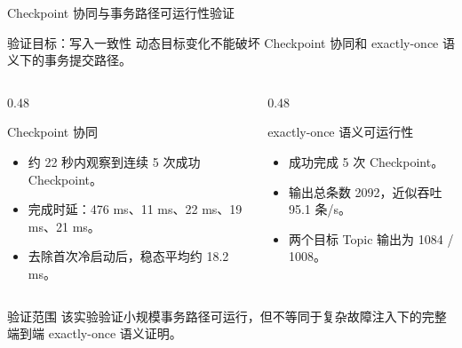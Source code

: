 \documentclass[fontset=macnew,xcolor=table,dvipsnames,svgnames,aspectratio=169]{ctexbeamer}
\begin{document}
\begin{frame}{Checkpoint 协同与事务路径可运行性验证}
  \scriptsize
  \begin{alertblock}{验证目标：写入一致性}
    动态目标变化不能破坏 Checkpoint 协同和 exactly-once 语义下的事务提交路径。
  \end{alertblock}
  \begin{columns}[T,onlytextwidth]
    \begin{column}{0.48\textwidth}
      \begin{block}{Checkpoint 协同}
        \begin{itemize}
          \item 约 22 秒内观察到连续 5 次成功 Checkpoint。
          \item 完成时延：476 ms、11 ms、22 ms、19 ms、21 ms。
          \item 去除首次冷启动后，稳态平均约 18.2 ms。
        \end{itemize}
      \end{block}
    \end{column}
    \begin{column}{0.48\textwidth}
      \begin{block}{exactly-once 语义可运行性}
        \begin{itemize}
          \item 成功完成 5 次 Checkpoint。
          \item 输出总条数 2092，近似吞吐 95.1 条/s。
          \item 两个目标 Topic 输出为 1084 / 1008。
        \end{itemize}
      \end{block}
    \end{column}
  \end{columns}
  \begin{alertblock}{验证范围}
    该实验验证小规模事务路径可运行，但不等同于复杂故障注入下的完整端到端 exactly-once 语义证明。
  \end{alertblock}
\end{frame}
\end{document}
